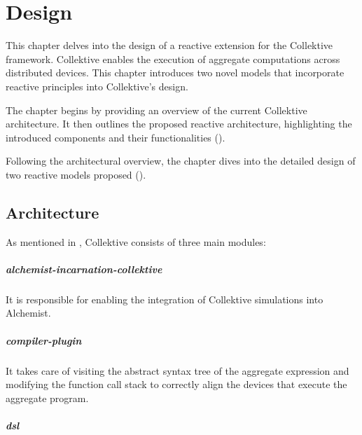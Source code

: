 
\chapter{Design}
\label{chap:design}

This chapter delves into the design of a reactive extension for the Collektive framework. Collektive enables the execution of aggregate computations across distributed devices. This chapter introduces two novel models that incorporate reactive principles into Collektive's design.

The chapter begins by providing an overview of the current Collektive architecture. It then outlines the proposed reactive architecture, highlighting the introduced components and their functionalities ().

Following the architectural overview, the chapter dives into the detailed design of two reactive models proposed ().

\section{Architecture}
\label{section:architecture}

As mentioned in , Collektive consists of three main modules:

\paragraph{alchemist-incarnation-collektive}

It is responsible for enabling the integration of Collektive simulations into Alchemist.

\paragraph{compiler-plugin}

It takes care of visiting the abstract syntax tree of the aggregate expression and modifying the function call stack to correctly align the devices that execute the aggregate program.

\paragraph{dsl}

